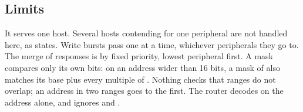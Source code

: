 \subsection*{Limits}

It serves one host. Several hosts contending for one peripheral are not
handled here, as  states. Write bursts pass one at a
time, whichever peripherals they go to. The merge of responses is by
fixed priority, lowest peripheral first. A mask compares only its own
bits: on an address wider than 16 bits, a mask of  also
matches its base plus every multiple of . Nothing checks
that ranges do not overlap; an address in two ranges goes to the first.
The router decodes on the address alone, and ignores  and
.
